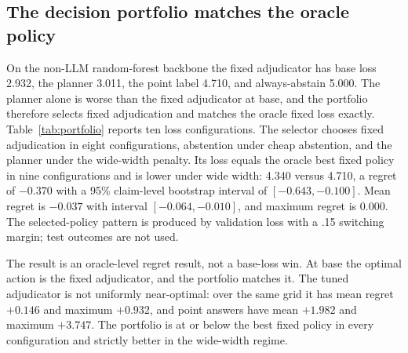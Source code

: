 \documentclass[11pt]{article}
\begin{document}
\subsection{The decision portfolio matches the oracle policy}
On the non-LLM random-forest backbone the fixed adjudicator has base loss 2.932, the planner 3.011, the point label 4.710, and always-abstain 5.000. The planner alone is worse than the fixed adjudicator at base, and the portfolio therefore selects fixed adjudication and matches the oracle fixed loss exactly. Table~\ref{tab:portfolio} reports ten loss configurations. The selector chooses fixed adjudication in eight configurations, abstention under cheap abstention, and the planner under the wide-width penalty. Its loss equals the oracle best fixed policy in nine configurations and is lower under wide width: 4.340 versus 4.710, a regret of $-0.370$ with a 95\% claim-level bootstrap interval of $[-0.643,-0.100]$. Mean regret is $-0.037$ with interval $[-0.064,-0.010]$, and maximum regret is $0.000$. The selected-policy pattern is produced by validation loss with a .15 switching margin; test outcomes are not used.

The result is an oracle-level regret result, not a base-loss win. At base the optimal action is the fixed adjudicator, and the portfolio matches it. The tuned adjudicator is not uniformly near-optimal: over the same grid it has mean regret $+0.146$ and maximum $+0.932$, and point answers have mean $+1.982$ and maximum $+3.747$. The portfolio is at or below the best fixed policy in every configuration and strictly better in the wide-width regime.
\end{document}
